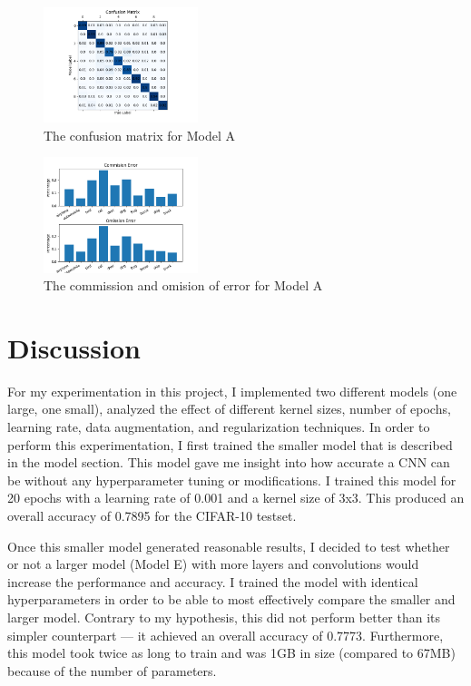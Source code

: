 \documentclass[11pt,a4paper]{article}
\begin{document}
\begin{figure}
  \centering
  \includegraphics[width=0.40\textwidth]{figures/confusion.png}
  \caption{The confusion matrix for Model A}
  \label{fig:confusion}
\end{figure}

\begin{figure}
  \centering
  \includegraphics[width=0.40\textwidth]{figures/commission_omision.png}
  \caption{The commission and omision of error for Model A}
  \label{fig:commission_omision}
\end{figure}



\section{Discussion}

For my experimentation in this project, I implemented two different models (one large, one small),
 analyzed the effect of different kernel sizes, number of epochs, learning rate, data augmentation, and regularization techniques. 
 In order to perform this experimentation, I first trained the smaller model that is described in the model section. 
 This model gave me insight into how accurate a CNN can be without any hyperparameter tuning or modifications. 
 I trained this model for 20 epochs with a learning rate of 0.001 and a kernel size of 3x3. This produced an overall 
 accuracy of 0.7895 for the CIFAR-10 testset. 

Once this smaller model generated reasonable results, I decided to test whether or not a larger model (Model E) with 
 more layers and convolutions would increase the performance and accuracy. I trained the model with identical hyperparameters
  in order to be able to most effectively compare the smaller and larger model. Contrary to my hypothesis, this did not perform
   better than its simpler counterpart --- it achieved an overall accuracy of 0.7773. Furthermore, this model took twice as long
    to train and was 1GB in size (compared to 67MB) because of the number of parameters. 
\end{document}
